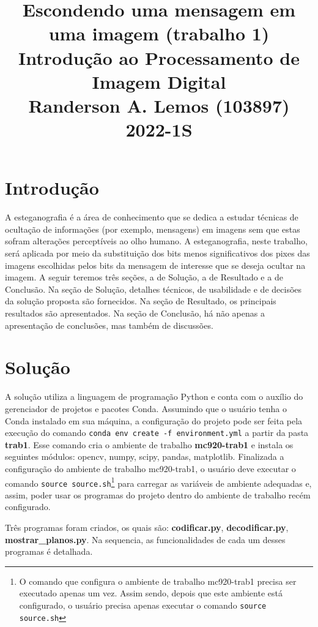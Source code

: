 \documentclass{article}
\title{
	Escondendo uma mensagem em uma imagem (trabalho 1) \\
	\Large Introdução ao Processamento de Imagem Digital \\
	Randerson A. Lemos (103897)
	2022-1S
}
\date{\vspace{-5ex}}
\begin{document}
  \maketitle

\section{Introdução}
A esteganografia é a área de conhecimento que se dedica a estudar técnicas de ocultação de informações (por exemplo, mensagens) em imagens sem que estas sofram alterações perceptíveis ao olho humano. A esteganografia, neste trabalho, será aplicada por meio da substituição dos bits menos significativos dos pixes das imagens escolhidas pelos bits da mensagem de interesse que se deseja ocultar na imagem. A seguir teremos três seções, a de Solução, a de Resultado e a de Conclusão. Na seção de Solução, detalhes técnicos, de usabilidade e de decisões da solução proposta são fornecidos. Na seção de Resultado, os principais resultados são apresentados. Na seção de Conclusão, há não apenas a apresentação de conclusões, mas também de discussões.

\section{Solução}
A solução utiliza a linguagem de programação Python e conta com o auxílio do gerenciador de projetos e pacotes Conda. Assumindo que o usuário tenha o Conda instalado em sua máquina, a configuração do projeto pode ser feita pela execução do comando \lstinline{conda env create -f environment.yml} a partir da pasta \textbf{trab1}. Esse comando cria o ambiente de trabalho \textbf{mc920-trab1} e instala os seguintes módulos: opencv, numpy, scipy, pandas, matplotlib. Finalizada a configuração do ambiente de trabalho mc920-trab1, o usuário deve executar o comando \lstinline{source source.sh}\footnote{O comando que configura o ambiente de trabalho mc920-trab1 precisa ser executado apenas um vez. Assim sendo, depois que este ambiente está configurado, o usuário precisa apenas executar o comando \lstinline{source source.sh}} para carregar as variáveis de ambiente adequadas e, assim, poder usar os programas do projeto dentro do ambiente de trabalho recém configurado. 

Três programas foram criados, os quais são: \textbf{codificar.py}, \textbf{decodificar.py}, \textbf{mostrar\_planos.py}. Na sequencia, as funcionalidades de cada um desses programas é detalhada.
\end{document}
